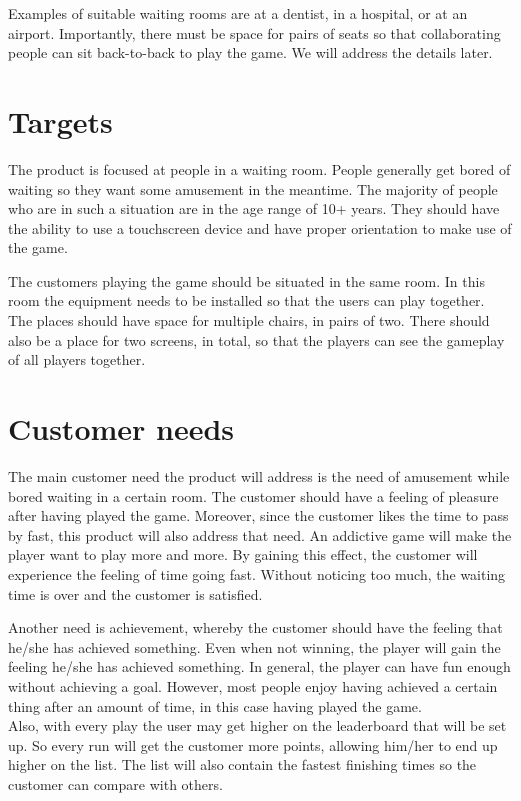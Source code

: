 \documentclass[11pt,twoside,a4paper]{article}
\begin{document}
Examples of suitable waiting rooms are at a dentist, in a hospital, or at an airport. Importantly, there must be space for pairs of seats so that collaborating people can sit back-to-back to play the game. We will address the details later.


\section{Targets}
The product is focused at people in a waiting room. People generally get bored of waiting so they want some amusement in the meantime. The majority of people who are in such a situation are in the age range of 10+ years. They should have the ability to use a touchscreen device and have proper orientation to make use of the game.

The customers playing the game should be situated in the same room. In this room the equipment needs to be installed so that the users can play together. The places should have space for multiple chairs, in pairs of two. There should also be a place for two screens, in total, so that the players can see the gameplay of all players together.


\section{Customer needs}
The main customer need the product will address is the need of amusement while bored waiting in a certain room. The customer should have a feeling of pleasure after having played the game. Moreover, since the customer likes the time to pass by fast, this product will also address that need. An addictive game will make the player want to play more and more. By gaining this effect, the customer will experience the feeling of time going fast. Without noticing too much, the waiting time is over and the customer is satisfied.

Another need is achievement, whereby the customer should have the feeling that he/she has achieved something. Even when not winning, the player will gain the feeling he/she has achieved something. In general, the player can have fun enough without achieving a goal. However, most people enjoy having achieved a certain thing after an amount of time, in this case having played the game. \\
Also, with every play the user may get higher on the leaderboard that will be set up. So every run will get the customer more points, allowing him/her to end up higher on the list. The list will also contain the fastest finishing times so the customer can compare with others.
\end{document}
